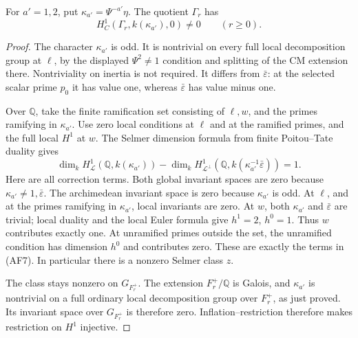 \begin{srlemma}\label{lem:frame-strict-classes}
For \(a'=1,2\), put \(\kappa_{a'}=\Psi^{-a'}\eta\).
The quotient \(\Gamma_r\) has
\[
                H_C^1(\Gamma_r,k(\kappa_{a'}),0)\ne0
                                  \qquad(r\ge0).              \tag{AF6}
\]
\end{srlemma}
\begin{proof}
The character \(\kappa_{a'}\) is odd.
It is nontrivial on every full local decomposition
group at \(\ell\), by the displayed \(\Psi^2\ne1\)
condition and splitting of the CM extension there.
Nontriviality on inertia is not required.
It differs from \(\bar\varepsilon\): at the selected
scalar prime \(p_0\) it has value one, whereas
\(\bar\varepsilon\) has value minus one.

Over \(\mathbb Q\), take the finite ramification set
consisting of \(\ell,w\), and the primes ramifying in
\(\kappa_{a'}\).
Use zero local conditions at \(\ell\) and at the
ramified primes, and the full local \(H^1\) at \(w\).
The Selmer dimension formula from finite
Poitou--Tate duality gives
\[
 \dim_k H^1_{\mathcal L}(\mathbb Q,k(\kappa_{a'}))
 -\dim_k H^1_{\mathcal L^\perp}
           (\mathbb Q,k(\kappa_{a'}^{-1}\bar\varepsilon))
                                                        =1 . \tag{AF7}
\]
Here are all correction terms.
Both global invariant spaces are zero because
\(\kappa_{a'}\ne1,\bar\varepsilon\).
The archimedean invariant space is zero because
\(\kappa_{a'}\) is odd.
At \(\ell\), and at the primes ramifying in
\(\kappa_{a'}\), local invariants are zero.
At \(w\), both \(\kappa_{a'}\) and
\(\bar\varepsilon\) are trivial; local duality and the
local Euler formula give \(h^1=2\), \(h^0=1\).
Thus \(w\) contributes exactly one.
At unramified primes outside the set, the unramified
condition has dimension \(h^0\) and contributes zero.
These are exactly the terms in (AF7).
In particular there is a nonzero Selmer class \(z\).

The class stays nonzero on \(G_{F_r^+}\).
The extension \(F_r^+/\mathbb Q\) is Galois, and
\(\kappa_{a'}\) is nontrivial on a full ordinary local
decomposition group over \(F_r^+\), as just proved.
Its invariant space over \(G_{F_r^+}\) is therefore zero.
Inflation--restriction therefore makes restriction
on \(H^1\) injective.


\end{proof}
